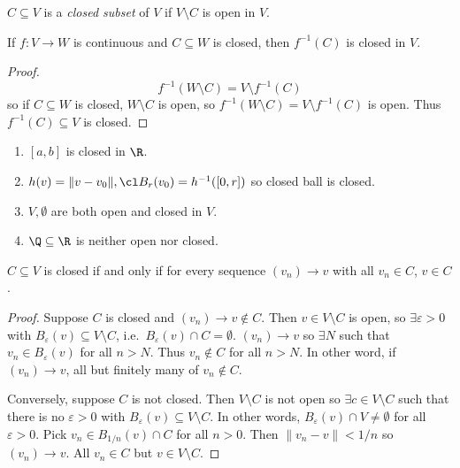 \documentclass[a4paper]{article}
\theoremstyle{definition}
\begin{document}
\begin{definition}
  $C\subseteq V$ is a \emph{closed subset} of $V$ if $V\setminus C$ is open in $V$.
\end{definition}

\begin{corollary}
  If $f:V\to W$ is continuous and $C\subseteq W$ is closed, then $f^{-1}(C)$ is closed in $V$.
\end{corollary}

\begin{proof}
  \[
    f^{-1}(W\setminus C) = V\setminus f^{-1}(C)
  \]
  so if $C\subseteq W$ is closed, $W\setminus C$ is open, so $f^{-1}(W\setminus C) = V\setminus f^{-1}(C)$ is open. Thus $f^{-1}(C)\subseteq V$ is closed.
\end{proof}

\begin{eg}\leavevmode
  \begin{enumerate}
  \item $[a,b]$ is closed in $\R$.
  \item $h(v) = \|v-v_0\|, \cl B_r(v_0) = h^{-1}([0,r])$ so closed ball is closed.
  \item $V, \emptyset$ are both open and closed in $V$.
    \item $\Q \subseteq \R$ is neither open nor closed.
  \end{enumerate}
\end{eg}

\begin{proposition}
  \(C \subseteq V\) is closed if and only if for every sequence \((v_n) \to v\) with all \(v_n \in C\), \(v\in C\).
\end{proposition}

\begin{proof}
  Suppose \(C\) is closed and \((v_n)\to v \notin C\). Then \(v\in V\setminus C\) is open, so \(\exists \varepsilon>0\) with \(B_\varepsilon(v) \subseteq V\setminus C\), i.e.\ \(B_\varepsilon(v) \cap C =\emptyset\). \((v_n)\to v\) so \(\exists N\) such that \(v_n\in B_\varepsilon(v)\) for all \(n>N\). Thus \(v_n \notin C\) for all \(n>N\). In other word, if \((v_n)\to v\), all but finitely many of \(v_n \notin C\).

  Conversely, suppose \(C\) is not closed. Then \(V\setminus C\) is not open so \(\exists c \in V\setminus C\) such that there is no \(\varepsilon>0\) with \(B_\varepsilon(v) \subseteq V\setminus C\). In other words, \(B_\varepsilon(v) \cap V \neq \emptyset\) for all \(\varepsilon>0\). Pick \(v_n\in B_{1/n}(v)\cap C\) for all \(n>0\). Then \(\|v_n-v\|< 1/n\) so \((v_n)\to v\). All \(v_n \in C\) but \(v\in V\setminus C\).
\end{proof}
\end{document}

